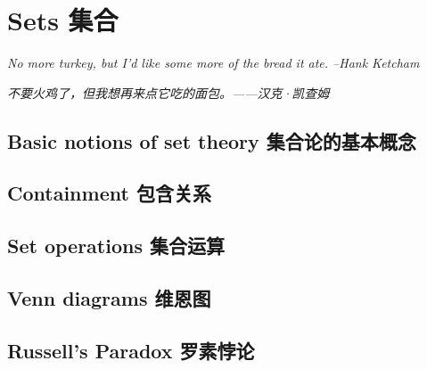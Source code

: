 \chapter{Sets 集合}

{\em No more turkey, but I'd like some more of the bread it ate. --Hank Ketcham}

{\em 不要火鸡了，但我想再来点它吃的面包。——汉克·凯查姆}


\section{Basic notions of set theory 集合论的基本概念}






\newpage

\section{Containment 包含关系}






\newpage



\clearpage

\section{Set operations 集合运算}





\clearpage

\section{Venn diagrams 维恩图}




\newpage

\section{Russell's Paradox 罗素悖论}





